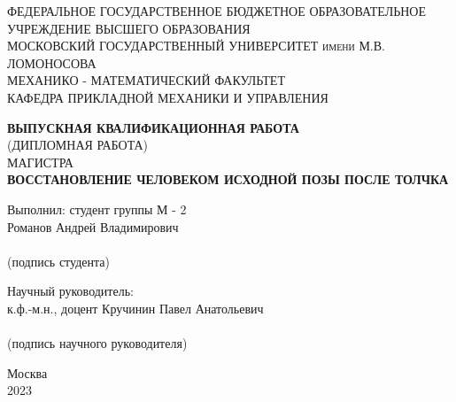 \documentclass[a4paper,12pt, openany]{book}
\theoremstyle{plain} %
\theoremstyle{definition} %
\theoremstyle{remark} %
\numberwithin{equation}{chapter}
\begin{document}
\listoftodos
\newpage
\thispagestyle{empty}


\begin{center}
    \large{\textsc{ФЕДЕРАЛЬНОЕ ГОСУДАРСТВЕННОЕ БЮДЖЕТНОЕ ОБРАЗОВАТЕЛЬНОЕ
            УЧРЕЖДЕНИЕ ВЫСШЕГО ОБРАЗОВАНИЯ}
    }\\
    \large{\textsc{МОСКОВСКИЙ ГОСУДАРСТВЕННЫЙ УНИВЕРСИТЕТ имени М.В. ЛОМОНОСОВА}
    } \\
    \vspace{0.4cm}
    \large{\textsc{МЕХАНИКО - МАТЕМАТИЧЕСКИЙ ФАКУЛЬТЕТ}}\\
    \vspace{0.4cm}
    \large{\textsc{КАФЕДРА ПРИКЛАДНОЙ МЕХАНИКИ И УПРАВЛЕНИЯ}}\\
    \hfill \break

    \hfill \break
    \large{\textbf{ВЫПУСКНАЯ КВАЛИФИКАЦИОННАЯ РАБОТА}\\
        (ДИПЛОМНАЯ РАБОТА) \\ МАГИСТРА \\
        \hfill \break \textsc{\textbf{ВОССТАНОВЛЕНИЕ ЧЕЛОВЕКОМ ИСХОДНОЙ ПОЗЫ ПОСЛЕ ТОЛЧКА}
        }}
\end{center}

\vspace{1.5cm}
\begin{flushright}
    \large{
        Выполнил: студент группы М - 2 \\ Романов Андрей Владимирович} \\ \vspace{0.68cm}  \underline{\hspace{6.5cm}} \\
    (подпись студента)

\end{flushright}

\begin{flushright}
    \large{
        Научный руководитель: \\ к.ф.-м.н., доцент Кручинин Павел Анатольевич} \\ \vspace{0.68cm}
    \underline{\hspace{6.5cm}} \\
    (подпись научного руководителя)
\end{flushright}
\vspace{0.7cm}
\begin{center} \large{Москва \\  2023} \end{center}
\end{document}
